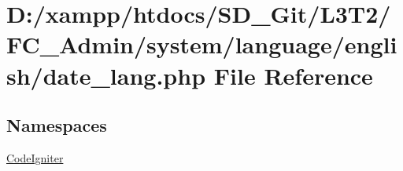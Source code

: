 \hypertarget{_admin_2system_2language_2english_2date__lang_8php}{}\section{D\+:/xampp/htdocs/\+S\+D\+\_\+\+Git/\+L3\+T2/\+F\+C\+\_\+\+Admin/system/language/english/date\+\_\+lang.php File Reference}
\label{_admin_2system_2language_2english_2date__lang_8php}
\subsection*{Namespaces}
\begin{DoxyCompactItemize}
\item 
 \hyperlink{namespace_code_igniter}{Code\+Igniter}
\end{DoxyCompactItemize}
